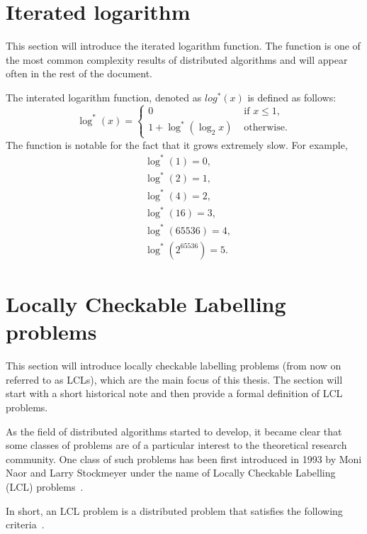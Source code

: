 \section{Iterated logarithm}

This section will introduce the iterated logarithm function. The function is
one of the most common complexity results of distributed algorithms and will
appear often in the rest of the document.

The interated logarithm function, denoted as $log^*(x)$ is defined as follows:
\[
    \log^*(x) = \begin{cases}
        0 & \text{ if $x \le 1$}, \\
        1 + \log^*(\log_2 x) & \text{ otherwise}.
    \end{cases}
\]
The function is notable for the fact that it grows extremely slow. For example,
\begin{align*}
  &\log^*(1) = 0, \\
  &\log^*(2) = 1, \\
  &\log^*(4) = 2, \\
  &\log^*(16) = 3, \\
  &\log^*(65536) = 4, \\
  &\log^*(2^{65536}) = 5.
\end{align*}

\section{Locally Checkable Labelling problems}

This section will introduce locally checkable labelling problems (from now on referred to as
LCLs), which are the main focus of this thesis. The section will start with
a short historical note and then provide a formal definition of
LCL problems.

As the field of distributed algorithms started to develop, it became clear
that some classes of problems
are of a particular interest to the theoretical research community.
One class of such problems has been first introduced in 1993 by
Moni Naor and Larry Stockmeyer under the name of Locally Checkable 
Labelling (LCL) problems~\cite{Naor1993}.

In short, an LCL problem is a distributed problem that satisfies the 
following criteria~\cite{Naor1993, Suomela2020}.

